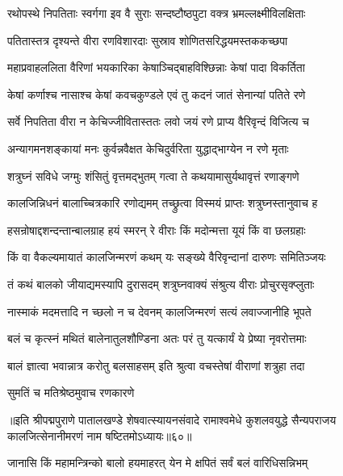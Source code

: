 \twolineshloka
{रथोपस्थे निपतिताः स्वर्गगा इव वै सुराः}
{सन्दष्टौष्ठपुटा वक्त्र भ्रमल्लक्ष्मीविलक्षिताः}%

\twolineshloka
{पतितास्तत्र दृश्यन्ते वीरा रणविशारदाः}
{सुस्राव शोणितसरिद्धयमस्तककच्छपा}%

\twolineshloka
{महाप्रवाहललिता वैरिणां भयकारिका}
{केषाञ्चिद्बाहविश्छिन्नाः केषां पादा विकर्तिता}%

\twolineshloka
{केषां कर्णाश्च नासाश्च केषां कवचकुण्डले}
{एवं तु कदनं जातं सेनान्यां पतिते रणे}%

\twolineshloka
{सर्वे निपतिता वीरा न केचिज्जीवितास्ततः}
{लवो जयं रणे प्राप्य वैरिवृन्दं विजित्य च}%

\twolineshloka
{अन्यागमनशङ्कायां मनः कुर्वन्नवैक्षत}
{केचिदुर्वरिता युद्धाद्भाग्येन न रणे मृताः}%

\twolineshloka
{शत्रुघ्नं सविधे जग्मुः शंसितुं वृत्तमद्भुतम्}
{गत्वा ते कथयामासुर्यथावृत्तं रणाङ्गणे}%

\twolineshloka
{कालजिन्निधनं बालाच्चित्रकारि रणोद्यमम्}
{तच्छ्रुत्वा विस्मयं प्राप्तः शत्रुघ्नस्तानुवाच ह}%

\twolineshloka
{हसन्रोषाद्दशन्दन्तान्बालग्राह हयं स्मरन्}
{रे वीराः किं मदोन्मत्ता यूयं किं वा छलग्रहाः}%

\twolineshloka
{किं वा वैकल्यमायातं कालजिन्मरणं कथम्}
{यः सङ्ख्ये वैरिवृन्दानां दारुणः समितिञ्जयः}%

\twolineshloka
{तं कथं बालको जीयाद्यमस्यापि दुरासदम्}
{शत्रुघ्नवाक्यं संश्रुत्य वीराः प्रोचुरसृक्प्लुताः}%

\twolineshloka
{नास्माकं मदमत्तादि न च्छलो न च देवनम्}
{कालजिन्मरणं सत्यं लवाज्जानीहि भूपते}%

\twolineshloka
{बलं च कृत्स्नं मथितं बालेनातुलशौण्डिना}
{अतः परं तु यत्कार्यं ये प्रेष्या नृवरोत्तमाः}%

\twolineshloka
{बालं ज्ञात्वा भवान्नात्र करोतु बलसाहसम्}
{इति श्रुत्वा वचस्तेषां वीराणां शत्रुहा तदा}%

\onelineshloka
{सुमतिं च मतिश्रेष्ठमुवाच रणकारणे}%

॥इति श्रीपद्मपुराणे पातालखण्डे शेषवात्स्यायनसंवादे रामाश्वमेधे कुशलवयुद्धे सैन्यपराजय कालजित्सेनानीमरणं नाम षष्टितमोऽध्यायः॥६०॥



\twolineshloka
{जानासि किं महामन्त्रिन्को बालो हयमाहरत्}
{येन मे क्षपितं सर्वं बलं वारिधिसन्निभम्}%


